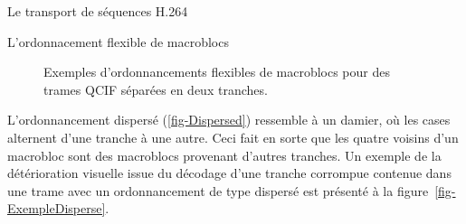 \documentclass[letterpaper, twoside, 12pt,memoire]{thETS}
\newcommand{\fig}[1]{figure~\ref{#1}}
\begin{document}
\begin{chapter}{Le transport de séquences H.264}
\begin{section}{L'ordonnacement flexible de macroblocs}
\begin{figure}[htb]
\caption{Exemples d'ordonnancements flexibles de macroblocs pour des trames
QCIF séparées en deux tranches.}
\label{fig-FrameCopy}
\end{figure}

L'ordonnancement dispersé (\ref{fig-Dispersed}) ressemble à un damier, où les
cases alternent d'une tranche à une autre. Ceci fait en sorte que les quatre
voisins d'un macrobloc sont des macroblocs provenant d'autres tranches. Un
exemple de la détérioration visuelle issue du décodage d'une tranche corrompue
contenue dans une trame avec un ordonnancement de type dispersé est présenté à
la \fig{fig-ExempleDisperse}. 


\end{section}
\end{chapter}
\end{document}
